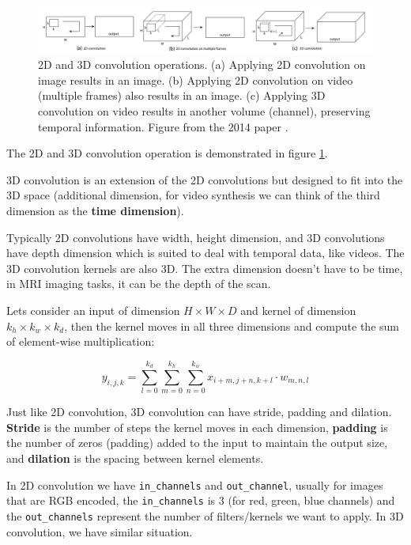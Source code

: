 \begin{figure}
    \centering
    \includegraphics[width=1\textwidth]{images/appendix/blocks/3d_conv.png}
    \caption{2D and 3D convolution operations. (a) Applying 2D convolution on image results in an image. (b) Applying 2D convolution on video (multiple frames) also results in an image. (c) Applying 3D convolution on video results in another volume (channel), preserving temporal information. Figure from the 2014 paper \cite{tran2015learning}.}
    \label{fig:appendix_blocks_3dconv}
\end{figure}

The 2D and 3D convolution operation is demonstrated in figure \ref{fig:appendix_blocks_3dconv}.

3D convolution is an extension of the 2D convolutions but designed to fit into the 3D space (additional dimension, for video synthesis we can think of the third dimension as the \textbf{time dimension}).

Typically 2D convolutions have width, height dimension, and 3D convolutions have depth dimension which is suited to deal with temporal data, like videos. The 3D convolution kernels are also 3D. The extra dimension doesn't have to be time, in MRI imaging tasks, it can be the depth of the scan.

Lets consider an input of dimension $H \times W \times D$ and kernel of dimension $k_h \times k_w \times k_d$, then the kernel moves in all three dimensions and compute the sum of element-wise multiplication:

\begin{equation*}
    y_{i,j,k} = \sum_{l=0}^{k_d} \sum_{m=0}^{k_h} \sum_{n=0}^{k_w} x_{i+m,j+n,k+l} \cdot w_{m,n,l}
\end{equation*}

Just like 2D convolution, 3D convolution can have stride, padding and dilation. \textbf{Stride} is the number of steps the kernel moves in each dimension, \textbf{padding} is the number of zeros (padding) added to the input to maintain the output size, and \textbf{dilation} is the spacing between kernel elements.

In 2D convolution we have \texttt{in\_channels} and \texttt{out\_channel}, usually for images that are RGB encoded, the \texttt{in\_channels} is 3 (for red, green, blue channels) and the \texttt{out\_channels} represent the number of filters/kernels we want to apply. In 3D convolution, we have similar situation. 
